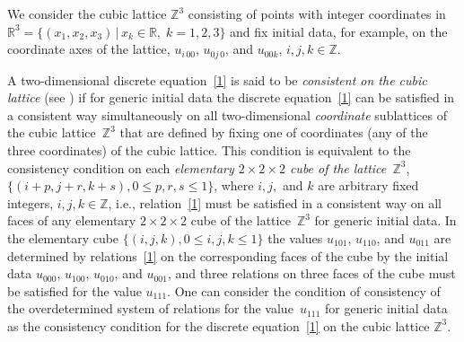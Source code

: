 We consider the cubic lattice $\mathbb{Z}^3$ consisting of points
with integer coordinates in $\mathbb{R}^3 = \{ (x_1, x_2, x_3)\,|\, x_k
\in \mathbb{R},\;  k =1, 2, 3 \}$ and f\/ix initial data, for example,
on the coordinate axes of the lattice, $u_{i\, 0 0}$, $u_{ 0 j\,
0}$, and $u_{ 0 0 k}$, $i, j, k \in \mathbb{Z}$.





A two-dimensional discrete equation~\eqref{1} is said to be {\it
consistent on the cubic lattice} (see \cite{3, 4, 5, 6, 7}) if for generic
initial data the discrete equation~\eqref{1} can be satisf\/ied in a
consistent way simultaneously on all two-dimensional {\it
coordinate} sublattices of the cubic lattice~$\mathbb{Z}^3$ that are
def\/ined by f\/ixing one of coordinates (any of the three coordinates)
of the cubic lattice. This condition is equivalent to the
consistency condition on each {\it elementary $2 \times 2 \times 2$
cube of the lattice~$\mathbb{Z}^3$}, $\{(i + p, j + r, k + s),  0
\leq p, r, s \leq 1\}$, where $i, j,$ and $k$ are arbitrary f\/ixed
integers, $i, j, k \in \mathbb{Z}$, i.e., relation~\eqref{1} must be
satisf\/ied in a consistent way on all faces of any elementary $2
\times 2 \times 2$ cube of the lattice~$\mathbb{Z}^3$ for generic
initial data. In the elementary cube $\{(i, j, k), 0 \leq i, j, k
\leq 1 \}$ the values $u_{1 0 1}$, $u_{1 1 0}$, and $u_{0 1 1}$ are
determined by relations~\eqref{1} on the corresponding faces of the
cube by the initial data $u_{0 0 0}$, $u_{1 0 0}$, $u_{0 1 0}$, and
$u_{0 0 1}$, and three relations on three faces of the cube must be
satisf\/ied for the value $u_{1 1 1}$. One can consider the condition
of consistency of the overdetermined system of relations for the
value~$u_{1 1 1}$ for generic initial data as the consistency
condition for the discrete equation~\eqref{1} on the cubic lattice
$\mathbb{Z}^3$.





